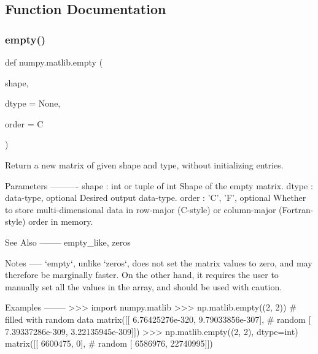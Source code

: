\subsection{Function Documentation}
\mbox{\label{namespacenumpy_1_1matlib_ae6880bc0a71e56b1bcf254f3fb0a9618}} 
\subsubsection{\texorpdfstring{empty()}{empty()}}
{\footnotesize\ttfamily def numpy.\+matlib.\+empty (\begin{DoxyParamCaption}\item[{}]{shape,  }\item[{}]{dtype = {\ttfamily None},  }\item[{}]{order = {\ttfamily \textquotesingle{}C\textquotesingle{}} }\end{DoxyParamCaption})}

\begin{DoxyVerb}Return a new matrix of given shape and type, without initializing entries.

Parameters
----------
shape : int or tuple of int
    Shape of the empty matrix.
dtype : data-type, optional
    Desired output data-type.
order : {'C', 'F'}, optional
    Whether to store multi-dimensional data in row-major
    (C-style) or column-major (Fortran-style) order in
    memory.

See Also
--------
empty_like, zeros

Notes
-----
`empty`, unlike `zeros`, does not set the matrix values to zero,
and may therefore be marginally faster.  On the other hand, it requires
the user to manually set all the values in the array, and should be
used with caution.

Examples
--------
>>> import numpy.matlib
>>> np.matlib.empty((2, 2))    # filled with random data
matrix([[  6.76425276e-320,   9.79033856e-307], # random
        [  7.39337286e-309,   3.22135945e-309]])
>>> np.matlib.empty((2, 2), dtype=int)
matrix([[ 6600475,        0], # random
        [ 6586976, 22740995]])\end{DoxyVerb}
 \mbox{\label{namespacenumpy_1_1matlib_ae948d4d47944f7c37fffdde431667728}} 
